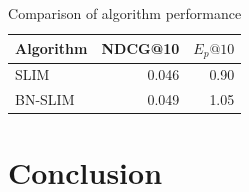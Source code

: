 \begin{table}
    \centering
\begin{tabular}{l|r|r}
    Algorithm & NDCG@10 & $E_p@10$ \\ \hline
    SLIM & 0.046 & 0.90 \\ \hline
    BN-SLIM & 0.049 & 1.05 \\ \hline
\end{tabular}
    \caption{Comparison of algorithm performance}
    \label{tab:results}
\end{table}





\section{Conclusion}

